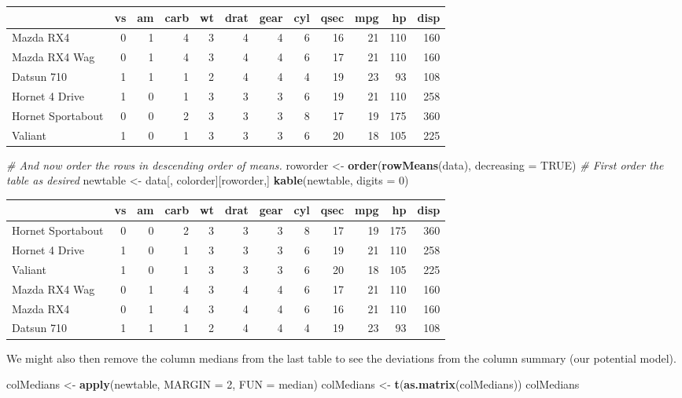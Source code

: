 \documentclass[]{article}
\newenvironment{Shaded}{\begin{snugshade}}{\end{snugshade}}
\newcommand{\KeywordTok}[1]{\textcolor[rgb]{0.13,0.29,0.53}{\textbf{#1}}}
\newcommand{\DataTypeTok}[1]{\textcolor[rgb]{0.13,0.29,0.53}{#1}}
\newcommand{\DecValTok}[1]{\textcolor[rgb]{0.00,0.00,0.81}{#1}}
\newcommand{\StringTok}[1]{\textcolor[rgb]{0.31,0.60,0.02}{#1}}
\newcommand{\CommentTok}[1]{\textcolor[rgb]{0.56,0.35,0.01}{\textit{#1}}}
\newcommand{\OtherTok}[1]{\textcolor[rgb]{0.56,0.35,0.01}{#1}}
\newcommand{\NormalTok}[1]{#1}
\begin{document}
\begin{longtable}[]{@{}lrrrrrrrrrrr@{}}
\toprule
& vs & am & carb & wt & drat & gear & cyl & qsec & mpg & hp &
disp\tabularnewline
\midrule
\endhead
Mazda RX4 & 0 & 1 & 4 & 3 & 4 & 4 & 6 & 16 & 21 & 110 &
160\tabularnewline
Mazda RX4 Wag & 0 & 1 & 4 & 3 & 4 & 4 & 6 & 17 & 21 & 110 &
160\tabularnewline
Datsun 710 & 1 & 1 & 1 & 2 & 4 & 4 & 4 & 19 & 23 & 93 &
108\tabularnewline
Hornet 4 Drive & 1 & 0 & 1 & 3 & 3 & 3 & 6 & 19 & 21 & 110 &
258\tabularnewline
Hornet Sportabout & 0 & 0 & 2 & 3 & 3 & 3 & 8 & 17 & 19 & 175 &
360\tabularnewline
Valiant & 1 & 0 & 1 & 3 & 3 & 3 & 6 & 20 & 18 & 105 & 225\tabularnewline
\bottomrule
\end{longtable}

\begin{Shaded}
\begin{Highlighting}[]
\CommentTok{# And now order the rows in descending order of means.}
\NormalTok{roworder <-}\StringTok{ }\KeywordTok{order}\NormalTok{(}\KeywordTok{rowMeans}\NormalTok{(data), }\DataTypeTok{decreasing =} \OtherTok{TRUE}\NormalTok{)}
\CommentTok{# First order the table as desired}
\NormalTok{newtable <-}\StringTok{ }\NormalTok{data[, colorder][roworder,]}
\KeywordTok{kable}\NormalTok{(newtable, }\DataTypeTok{digits =} \DecValTok{0}\NormalTok{)}
\end{Highlighting}
\end{Shaded}

\begin{longtable}[]{@{}lrrrrrrrrrrr@{}}
\toprule
& vs & am & carb & wt & drat & gear & cyl & qsec & mpg & hp &
disp\tabularnewline
\midrule
\endhead
Hornet Sportabout & 0 & 0 & 2 & 3 & 3 & 3 & 8 & 17 & 19 & 175 &
360\tabularnewline
Hornet 4 Drive & 1 & 0 & 1 & 3 & 3 & 3 & 6 & 19 & 21 & 110 &
258\tabularnewline
Valiant & 1 & 0 & 1 & 3 & 3 & 3 & 6 & 20 & 18 & 105 & 225\tabularnewline
Mazda RX4 Wag & 0 & 1 & 4 & 3 & 4 & 4 & 6 & 17 & 21 & 110 &
160\tabularnewline
Mazda RX4 & 0 & 1 & 4 & 3 & 4 & 4 & 6 & 16 & 21 & 110 &
160\tabularnewline
Datsun 710 & 1 & 1 & 1 & 2 & 4 & 4 & 4 & 19 & 23 & 93 &
108\tabularnewline
\bottomrule
\end{longtable}

We might also then remove the column medians from the last table to see
the deviations from the column summary (our potential model).

\begin{Shaded}
\begin{Highlighting}[]
\NormalTok{colMedians <-}\StringTok{ }\KeywordTok{apply}\NormalTok{(newtable, }\DataTypeTok{MARGIN =} \DecValTok{2}\NormalTok{, }\DataTypeTok{FUN =}\NormalTok{ median)}
\NormalTok{colMedians <-}\StringTok{ }\KeywordTok{t}\NormalTok{(}\KeywordTok{as.matrix}\NormalTok{(colMedians))}
\NormalTok{colMedians}
\end{Highlighting}
\end{Shaded}
\end{document}

